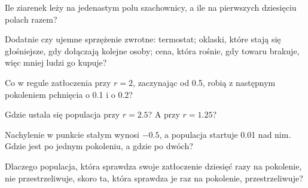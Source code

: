 \begin{checkpoint}
\item Ile ziarenek leży na jedenastym polu szachownicy, a ile na pierwszych
  dziesięciu polach razem?
\item Dodatnie czy ujemne sprzężenie zwrotne: termostat; oklaski, które stają
  się głośniejsze, gdy dołączają kolejne osoby; cena, która rośnie, gdy
  towaru brakuje, więc mniej ludzi go kupuje?
\item Co w regule zatłoczenia przy $r = 2$, zaczynając od \num{0.5}, robią z
  następnym pokoleniem pchnięcia o \num{0.1} i o \num{0.2}?
\item Gdzie ustala się populacja przy $r = \num{2.5}$? A przy
  $r = \num{1.25}$?
\item Nachylenie w punkcie stałym wynosi $-\num{0.5}$, a populacja startuje
  \num{0.01} nad nim. Gdzie jest po jednym pokoleniu, a gdzie po dwóch?
\item Dlaczego populacja, która sprawdza swoje zatłoczenie dziesięć razy na
  pokolenie, nie przestrzeliwuje, skoro ta, która sprawdza je raz na
  pokolenie, przestrzeliwuje?
\end{checkpoint}
